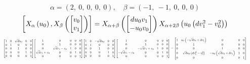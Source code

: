 \documentclass[11pt]{article}
\theoremstyle{definition}
\begin{document}
\[
\alpha = \left( 2, \  0, \  0, \  0, \  0\right), \quad \beta = \left( -1, \  -1, \  0, \  0, \  0\right)
\]
\[
\scaletoalign{\textwidth}{\left[ X_{\alpha}\left(u_{0}\right), X_{\beta}\left(\left[\begin{matrix}v_{0}\\v_{1}\end{matrix}\right]\right) \right] = X_{\alpha + \beta}\left(\left[\begin{matrix}d u_{0} v_{1}\\- u_{0} v_{0}\end{matrix}\right]\right) X_{\alpha + 2\beta}\left(u_{0} \left(d v_{1}^{2} - v_{0}^{2}\right)\right)}
\]
\[
\scaletoalign{\textwidth}{{\left[\begin{matrix}1 & 0 & \sqrt{d} u_{0} & 0 & 0\\0 & 1 & 0 & 0 & 0\\0 & 0 & 1 & 0 & 0\\0 & 0 & 0 & 1 & 0\\0 & 0 & 0 & 0 & 1\end{matrix}\right]} {\left[\begin{matrix}1 & 0 & 0 & 0 & 0\\0 & 1 & 0 & 0 & 0\\0 & \sqrt{d} v_{1} - v_{0} & 1 & 0 & 0\\\sqrt{d} v_{1} + v_{0} & 0 & 0 & 1 & 0\\0 & 0 & 0 & 0 & 1\end{matrix}\right]} {\left[\begin{matrix}1 & 0 & - \sqrt{d} u_{0} & 0 & 0\\0 & 1 & 0 & 0 & 0\\0 & 0 & 1 & 0 & 0\\0 & 0 & 0 & 1 & 0\\0 & 0 & 0 & 0 & 1\end{matrix}\right]} {\left[\begin{matrix}1 & 0 & 0 & 0 & 0\\0 & 1 & 0 & 0 & 0\\0 & - \sqrt{d} v_{1} + v_{0} & 1 & 0 & 0\\- \sqrt{d} v_{1} - v_{0} & 0 & 0 & 1 & 0\\0 & 0 & 0 & 0 & 1\end{matrix}\right]} = {\left[\begin{matrix}1 & u_{0} \left(- \sqrt{d} v_{0} + d v_{1}\right) & 0 & 0 & 0\\0 & 1 & 0 & 0 & 0\\0 & 0 & 1 & 0 & 0\\0 & \sqrt{d} u_{0} \left(d v_{1}^{2} - v_{0}^{2}\right) & - u_{0} \left(\sqrt{d} v_{0} + d v_{1}\right) & 1 & 0\\0 & 0 & 0 & 0 & 1\end{matrix}\right]}}
\]
\end{document}
